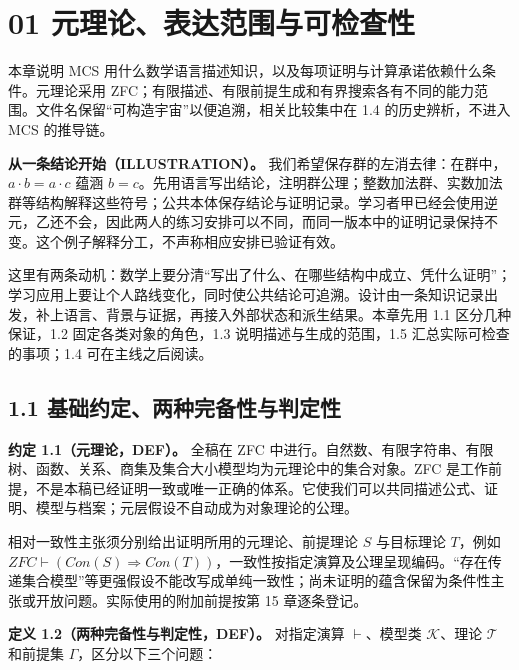 \documentclass[UTF8,a4paper,zihao=-4,fontset=windows,openany]{ctexbook}
\newcommand{\mcsorigin}[1]{\par\noindent{\small\color{black!55}#1}\par\addvspace{0.8em}}
\def\mathrm#1{#1}%
\begin{document}
\clearpage\chapter{01 元理论、表达范围与可检查性}
\label{mcs-source-3}
\mcsorigin{原章节：01-元理论与可构造宇宙.md}
本章说明 MCS 用什么数学语言描述知识，以及每项证明与计算承诺依赖什么条件。元理论采用 ZFC；有限描述、有限前提生成和有界搜索各有不同的能力范围。文件名保留“可构造宇宙”以便追溯，相关比较集中在 1.4 的历史辨析，不进入 MCS 的推导链。

\textbf{从一条结论开始（ILLUSTRATION）。} 我们希望保存群的左消去律：在群中，\(a\cdot b=a\cdot c\) 蕴涵 \(b=c\)。先用语言写出结论，注明群公理；整数加法群、实数加法群等结构解释这些符号；公共本体保存结论与证明记录。学习者甲已经会使用逆元，乙还不会，因此两人的练习安排可以不同，而同一版本中的证明记录保持不变。这个例子解释分工，不声称相应安排已验证有效。

这里有两条动机：数学上要分清“写出了什么、在哪些结构中成立、凭什么证明”；学习应用上要让个人路线变化，同时使公共结论可追溯。设计由一条知识记录出发，补上语言、背景与证据，再接入外部状态和派生结果。本章先用 1.1 区分几种保证，1.2 固定各类对象的角色，1.3 说明描述与生成的范围，1.5 汇总实际可检查的事项；1.4 可在主线之后阅读。

\section{1.1 基础约定、两种完备性与判定性}
\textbf{约定 1.1（元理论，DEF）。} 全稿在 ZFC 中进行。自然数、有限字符串、有限树、函数、关系、商集及集合大小模型均为元理论中的集合对象。ZFC 是工作前提，不是本稿已经证明一致或唯一正确的体系。它使我们可以共同描述公式、证明、模型与档案；元层假设不自动成为对象理论的公理。

相对一致性主张须分别给出证明所用的元理论、前提理论 \(S\) 与目标理论 \(T\)，例如 \(\mathrm{ZFC}\vdash(\mathrm{Con}(S)\Rightarrow\mathrm{Con}(T))\)，一致性按指定演算及公理呈现编码。“存在传递集合模型”等更强假设不能改写成单纯一致性；尚未证明的蕴含保留为条件性主张或开放问题。实际使用的附加前提按第 15 章逐条登记。

\textbf{定义 1.2（两种完备性与判定性，DEF）。} 对指定演算 \(\vdash\)、模型类 \(\mathcal K\)、理论 \(\mathcal T\) 和前提集 \(\Gamma\)，区分以下三个问题：
\end{document}
